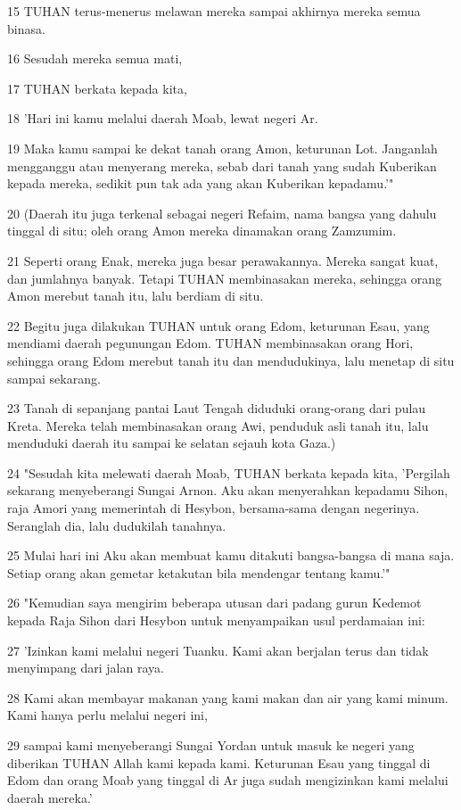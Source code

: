 \par 15 TUHAN terus-menerus melawan mereka sampai akhirnya mereka semua binasa.
\par 16 Sesudah mereka semua mati,
\par 17 TUHAN berkata kepada kita,
\par 18 'Hari ini kamu melalui daerah Moab, lewat negeri Ar.
\par 19 Maka kamu sampai ke dekat tanah orang Amon, keturunan Lot. Janganlah mengganggu atau menyerang mereka, sebab dari tanah yang sudah Kuberikan kepada mereka, sedikit pun tak ada yang akan Kuberikan kepadamu.'"
\par 20 (Daerah itu juga terkenal sebagai negeri Refaim, nama bangsa yang dahulu tinggal di situ; oleh orang Amon mereka dinamakan orang Zamzumim.
\par 21 Seperti orang Enak, mereka juga besar perawakannya. Mereka sangat kuat, dan jumlahnya banyak. Tetapi TUHAN membinasakan mereka, sehingga orang Amon merebut tanah itu, lalu berdiam di situ.
\par 22 Begitu juga dilakukan TUHAN untuk orang Edom, keturunan Esau, yang mendiami daerah pegunungan Edom. TUHAN membinasakan orang Hori, sehingga orang Edom merebut tanah itu dan mendudukinya, lalu menetap di situ sampai sekarang.
\par 23 Tanah di sepanjang pantai Laut Tengah diduduki orang-orang dari pulau Kreta. Mereka telah membinasakan orang Awi, penduduk asli tanah itu, lalu menduduki daerah itu sampai ke selatan sejauh kota Gaza.)
\par 24 "Sesudah kita melewati daerah Moab, TUHAN berkata kepada kita, 'Pergilah sekarang menyeberangi Sungai Arnon. Aku akan menyerahkan kepadamu Sihon, raja Amori yang memerintah di Hesybon, bersama-sama dengan negerinya. Seranglah dia, lalu dudukilah tanahnya.
\par 25 Mulai hari ini Aku akan membuat kamu ditakuti bangsa-bangsa di mana saja. Setiap orang akan gemetar ketakutan bila mendengar tentang kamu.'"
\par 26 "Kemudian saya mengirim beberapa utusan dari padang gurun Kedemot kepada Raja Sihon dari Hesybon untuk menyampaikan usul perdamaian ini:
\par 27 'Izinkan kami melalui negeri Tuanku. Kami akan berjalan terus dan tidak menyimpang dari jalan raya.
\par 28 Kami akan membayar makanan yang kami makan dan air yang kami minum. Kami hanya perlu melalui negeri ini,
\par 29 sampai kami menyeberangi Sungai Yordan untuk masuk ke negeri yang diberikan TUHAN Allah kami kepada kami. Keturunan Esau yang tinggal di Edom dan orang Moab yang tinggal di Ar juga sudah mengizinkan kami melalui daerah mereka.'
